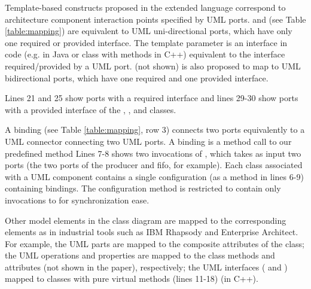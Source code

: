 \noindent
{}
Template-based constructs proposed in the extended language correspond to architecture component interaction points specified by UML ports.
 and  (see Table \ref{table:mapping}) are equivalent to UML uni-directional ports, which have only one required or provided interface.
The  template parameter is an interface in code (e.g.  in Java or class with  methods in C++) equivalent to the interface required/provided by a UML port. 
 (not shown) is also proposed to map to UML bidirectional ports, which have one required and one provided interface.


Lines 21 and 25 show ports with a required interface and lines 29-30 show ports with a provided interface of the , , and  classes.

\noindent
{}
A binding (see Table \ref{table:mapping}, row 3) connects two ports equivalently to a UML connector connecting two UML ports.
A binding is a method call to our predefined method 
Lines 7-8 shows two invocations of , which takes as input two ports (the two ports of the producer and fifo, for example).
Each class associated with a UML component contains a single configuration (as a method in lines 6-9) containing bindings.
The configuration method is restricted to contain only invocations to  for synchronization ease.

Other model elements in the class diagram are mapped to the corresponding elements as in industrial tools such as IBM Rhapsody and Enterprise Architect.
For example, the  UML parts are mapped to the composite attributes of the  class; the UML operations and properties are mapped to the class methods and attributes (not shown in the paper), respectively; the UML interfaces ( and ) mapped to classes with pure virtual methods (lines 11-18) (in C++). 

